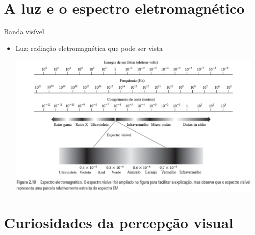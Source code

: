      \section[ slide = true]{A luz e o espectro eletromagnético}
      \begin{slide}[toc=]{Banda visível}
         \begin{itemize}[type=1]
            \item Luz: radiação eletromagnética que pode ser vista
            \begin{center}
               \includegraphics[width=.8\textwidth]{figs/fig0210}
            \end{center}
         \end{itemize}         
      \end{slide}
 
   \section[ slide = true]{Curiosidades da percepção visual}


